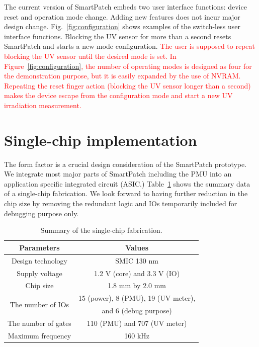 \documentclass[journal]{IEEEtran}
\begin{document}
The current version of SmartPatch embeds two user interface functions: device reset and operation mode change. Adding new features does not incur major design change. Fig.~\ref{fig:configuration} shows examples of the switch-less user interface functions. Blocking the UV sensor for more than a second resets SmartPatch and starts a new mode configuration. \textcolor{red}{The user is supposed to repeat blocking the UV sensor until the desired  mode is set. In Figure~\ref{fig:configuration}, the number of operating modes is designed as four for the demonstration purpose, but it is easily expanded by the use of NVRAM. Repeating the reset finger action (blocking the UV sensor longer than a second) makes the device escape from the configuration mode and start a new UV irradiation measurement.}

\section{Single-chip implementation}

The form factor is a crucial design consideration of the SmartPatch prototype.
We integrate most major parts of SmartPatch including the PMU into an application specific integrated circuit (ASIC.)
Table~\ref{table:fab_summary} shows the summary data of a single-chip fabrication.
We look forward to having further reduction in the chip size by removing the redundant logic and IOs temporarily included for debugging purpose only.

\begin{table}
\centering
\caption{Summary of the single-chip fabrication.}
\label{table:fab_summary}
\begin{tabular}{|c|c|}  \hline
Parameters			&Values	\\ \hline \hline
Design technology		&SMIC 130 nm  \\ \hline
Supply voltage		&1.2 V (core) and 3.3 V (IO) \\ \hline
Chip size				&1.8 mm by 2.0 mm \\ \hline
\multirow{2}{*}{The number of IOs}		&15 (power), 8 (PMU), 19 (UV meter), \\
					&and 6 (debug purpose) \\ \hline		
The number of gates	&110 (PMU) and 707 (UV meter) \\ \hline
Maximum frequency	&160 kHz \\ \hline		
\end{tabular}
\end{table}
\end{document}
